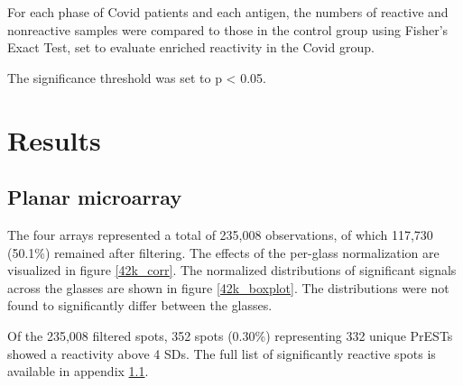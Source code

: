 \documentclass{article}
\begin{document}
For each phase of Covid patients and each antigen, the numbers of reactive and nonreactive samples were compared to those in the control group using Fisher's Exact Test, set to evaluate enriched reactivity in the Covid group.

The significance threshold was set to p < 0.05.

\section{Results}
\subsection{Planar microarray}\label{42k_results}
The four arrays represented a total of 235,008 observations, of which 117,730 (50.1\%) remained after filtering. The effects of the per-glass normalization are visualized in figure \ref{42k_corr}. The normalized distributions of significant signals across the glasses are shown in figure \ref{42k_boxplot}. The distributions were not found to significantly differ between the glasses.

Of the 235,008 filtered spots, 352 spots (0.30\%) representing 332 unique PrESTs showed a reactivity above 4 SDs. The full list of significantly reactive spots is available in appendix \ref{42k_results}.
\end{document}
